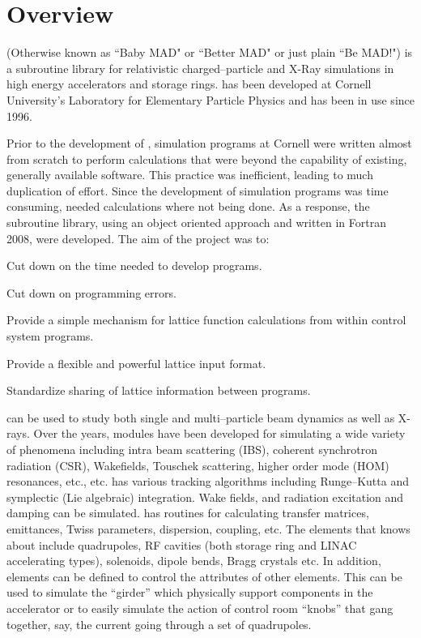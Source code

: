 \section*{Overview}

\bmad (Otherwise known as ``Baby MAD" or ``Better MAD" or just plain
``Be MAD!") is a subroutine library for relativistic
charged--particle and X-Ray simulations in high energy accelerators and
storage rings. \bmad has been developed at Cornell University's
Laboratory for Elementary Particle Physics and has been in use since
1996.

Prior to the development of \bmad, simulation programs at Cornell were
written almost from scratch to perform calculations that were beyond
the capability of existing, generally available software. This
practice was inefficient, leading to much duplication of effort.
Since the development of simulation programs was time consuming,
needed calculations where not being done.  
As a response, the \bmad subroutine library, using an
object oriented approach and written in Fortran 2008, were developed.
The aim of the \bmad project was to:
\begin{Itemize}
\item Cut down on the time needed to develop programs.
\item Cut down on programming errors.
\item Provide a simple mechanism for lattice function calculations
from within control system programs.
\item Provide a flexible and powerful lattice input format.
\item Standardize sharing of lattice information between 
programs.
\end{Itemize}

\bmad can be used to study both single and multi--particle beam dynamics as well as X-rays. 
Over the years, \bmad modules have been developed for simulating a wide variety of phenomena 
including intra beam scattering (IBS), coherent synchrotron radiation (CSR), Wakefields, 
Touschek scattering, higher order mode (HOM) resonances, etc., etc.
\bmad has various
tracking algorithms including Runge--Kutta and symplectic (Lie
algebraic) integration.  Wake fields, and radiation excitation and
damping can be simulated. \bmad has routines for calculating transfer
matrices, emittances, Twiss parameters, dispersion, coupling, etc. The
elements that \bmad knows about include quadrupoles, RF cavities (both
storage ring and LINAC accelerating types), solenoids, dipole bends,
Bragg crystals etc. 
In addition, elements can be defined to control the attributes of
other elements. This can be used to simulate the ``girder'' which
physically support components in the accelerator or to easily simulate
the action of control room ``knobs'' that gang together, say, the
current going through a set of quadrupoles.

